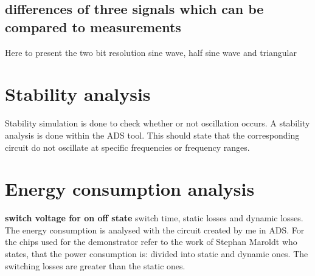 \subsection{differences of three signals which can be compared to measurements}
Here to present the two bit resolution sine wave, half sine wave and triangular



\section{Stability analysis}
Stability simulation is done to check whether or not oscillation occurs.
A stability analysis is done within the ADS tool. This should state that the corresponding circuit do not oscillate at specific frequencies or frequency ranges.

\section{Energy consumption analysis}
\textbf{switch voltage for on off state} switch time, static losses and dynamic losses.
The energy consumption is analysed with the circuit created by me in ADS. For the chips used for the demonstrator refer to the work of Stephan Maroldt who states, that the power consumption is:  divided into static and dynamic ones. The switching losses are greater than the static ones.
